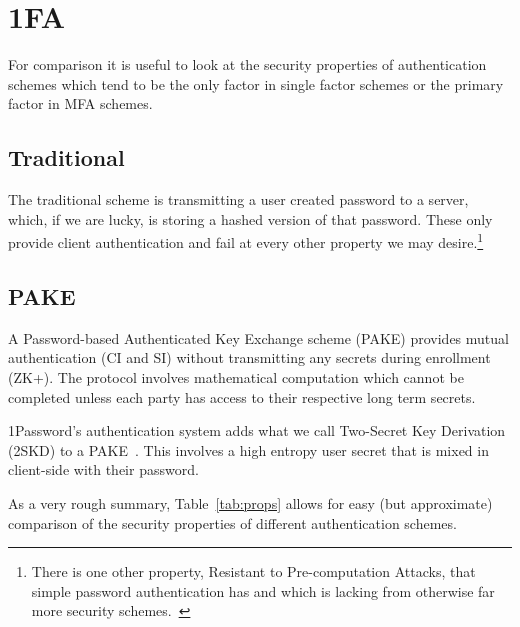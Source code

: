 \documentclass[12pt]{article}
\newcommand{\prop}[1]{\textsf{#1}}
\begin{document}
\section{1FA}

For comparison it is useful to look at the security properties
of authentication schemes which tend to be the only factor in single
factor schemes or the primary factor in MFA schemes.

\subsection{Traditional}
The traditional scheme is transmitting a user created password to a server, which, if we are lucky, is storing a hashed version of that password. These only provide client authentication and fail at every other property we may desire.\footnote{There is one other property, Resistant to Pre-computation Attacks, that simple password authentication has and which is lacking from otherwise far more security schemes.~\autocite{JareckiETAL2018:OPAQUE}}

\subsection{PAKE}
A Password-based Authenticated Key Exchange scheme (PAKE) provides mutual authentication (\prop{CI} and \prop{SI}) without transmitting any secrets during enrollment (\prop{ZK+}). The protocol involves mathematical computation which cannot be completed unless each party has access to their respective long term secrets.

1Password's authentication system adds what we call
Two-Secret Key Derivation (2SKD) to a PAKE~\autocite{1Password:whitepaper}.
This involves a
high entropy user secret that is mixed in client-side with their password.

As a very rough summary, Table~\ref{tab:props} allows for easy
(but approximate) comparison of the security properties of different
authentication schemes.
\end{document}
